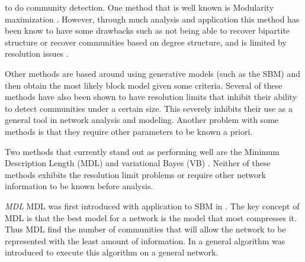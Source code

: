 \documentclass[twocolumn,twoside]{IEEEtran}
\begin{document}
% 
% 
% 
to do community detection. One method that is well known is Modularity
maximization \cite{Newman2004}. However, through much analysis and application
this method has been know to have some drawbacks such as not being able to
recover bipartite structure \cite{Peixoto2013} or recover communities based on
degree structure, and is limited by resolution issues
\cite{fortunato2007resolution}.

Other methods are based around using generative models (such as the SBM) and
then obtain the most likely block model given some criteria. Several of these
methods have also been shown to have resolution
limits\cite{fortunato2007resolution} that inhibit their ability to detect
communities under a certain size. This severely inhibits their use as a general
tool in network analysis and modeling. Another problem with some methods is
that they require other parameters to be known a priori.

Two methods that currently stand out as performing well are the Minimum
Description Length (MDL) \cite{Peixoto2013} and variational Bayes (VB)
\cite{Hofman2008}. Neither of these methods exhibits the resolution limit
problems or require other network information to be known before analysis.

\emph{MDL} MDL was first introduced with application to SBM in
\cite{Rosvall2007}. The key concept of MDL is that the best model for a network
is the model that most compresses it. Thus MDL find the number of communities
that will allow the network to be represented with the least amount of
information. In \cite{Peixoto2013} a general algorithm was introduced to
execute this algorithm on a general network.
\end{document}
